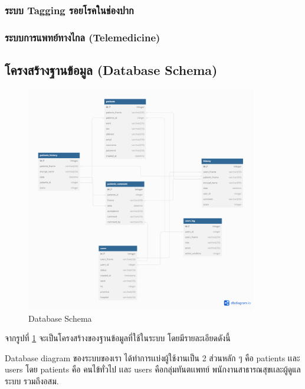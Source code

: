 \subsubsection{ระบบ Tagging รอยโรคในช่องปาก}

\subsubsection{ระบบการแพทย์ทางไกล (Telemedicine)}



\subsection{โครงสร้างฐานข้อมูล (Database Schema)}
\begin{figure}[h]
    \begin{center}
        \includegraphics[width=0.9\textwidth]{img/database.png}
    \end{center}
    \caption[Poem]{Database Schema}
    \label{fig:data_schema}
\end{figure}
จากรูปที่ \ref{fig:data_schema} จะเป็นโครงสร้างของฐานข้อมูลที่ใช้ในระบบ โดยมีรายละเอียดดังนี้



Database diagram ของระบบของเรา ได้ทำการเเบ่งผู้ใช้งานเป็น 2 ส่วนหลัก ๆ คือ patients เเละ users โดย patients คือ คนไข้ทั่วไป เเละ users คือกลุ่มทันตเเพทย์ พนักงานสาธารณสุขเเละผู้ดูแลระบบ รวมถึงอสม.

